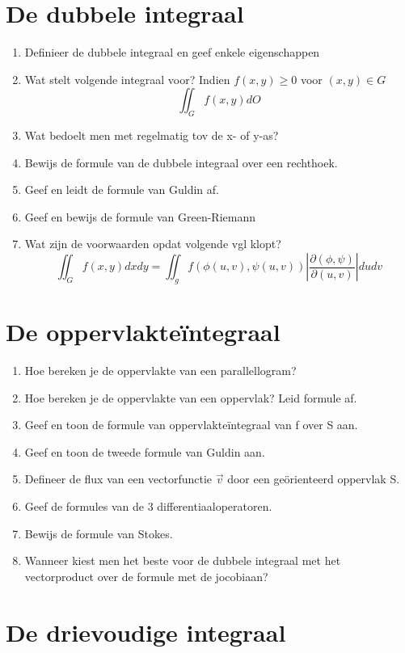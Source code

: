 \documentclass[a4paper,12pt]{article}
\begin{document}
    
    \section{De dubbele integraal}
    \begin{enumerate}
        \item Definieer de dubbele integraal en geef enkele eigenschappen
        \item Wat stelt volgende integraal voor? Indien $f(x,y) \geq 0$ voor $(x,y) \in G$
            $$ \iint_G f(x,y)dO $$
        \item Wat bedoelt men met regelmatig tov de x- of y-as?
        \item Bewijs de formule van de dubbele integraal over een rechthoek.
        \item Geef en leidt de formule van Guldin af.
        \item Geef en bewijs de formule van Green-Riemann
        \item Wat zijn de voorwaarden opdat volgende vgl klopt?
            $$ \iint_G f(x,y)dxdy = \iint_g f(\phi(u,v), \psi(u,v)) \left|\frac{\partial(\phi, \psi)}{\partial(u,v)}\right| dudv $$
    \end{enumerate}

    \section{De oppervlakte\"integraal}
    \begin{enumerate}
        \item Hoe bereken je de oppervlakte van een parallellogram?
        \item Hoe bereken je de oppervlakte van een oppervlak? Leid formule af.
        \item Geef en toon de formule van oppervlakteïntegraal van f over S aan.
        \item Geef en toon de tweede formule van Guldin aan.
        \item Defineer de flux van een vectorfunctie $\vec{v}$ door een geörienteerd oppervlak S.
        \item Geef de formules van de 3 differentiaaloperatoren.
        \item Bewijs de formule van Stokes.
	\item Wanneer kiest men het beste voor de dubbele integraal met het vectorproduct over de formule met de jocobiaan?
    \end{enumerate}
    

    \section{De drievoudige integraal}
\end{document}
